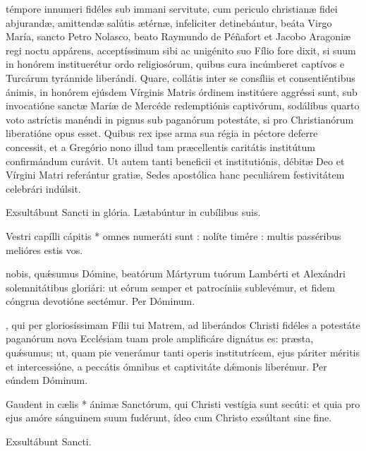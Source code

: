 \documentclass[fontsize=9pt,paper=A6,twoside,BCOR=1mm,DIV=22,headinclude]{scrarticle}
\begin{document}
\begin{multicols}{2}
{
 témpore innumeri fidéles sub immani servitute, cum periculo christianæ fidei abjurandæ, amittendæ salútis ætérnæ, infeliciter detinebántur, beáta Virgo María, sancto Petro Nolasco, beato Raymundo de Péñafort et Jacobo Aragoniæ regi noctu appárens, acceptíssimum sibi ac unigénito suo Fílio fore dixit, si suum in honórem instituerétur ordo religiosórum, quibus cura incúmberet captívos e Turcárum tyránnide liberándi. Quare, collátis inter se consíliis et consentiéntibus ánimis, in honórem ejúsdem Vírginis Matris órdinem institúere aggréssi sunt, sub invocatióne sanctæ Maríæ de Mercéde redemptiónis captivórum, sodálibus quarto voto astríctis manéndi in pignus sub paganórum potestáte, si pro Christianórum liberatióne opus esset. Quibus rex ipse arma sua régia in péctore deferre concessit, et a Gregório nono illud tam præcellentis caritátis institútum confirmándum curávit. Ut autem tanti beneficii et institutiónis, débitæ Deo et Vírgini Matri referántur gratiæ, Sedes apostólica hanc peculiárem festivitátem celebrári indúlsit.

\Te

\V Exsultábunt Sancti in glória.
\R Lætabúntur in cubílibus suis.

\B Vestri capílli cápitis * omnes numeráti sunt : nolíte timére : multis passéribus melióres estis vos.

 nobis, qu\'æsumus Dómine, beatórum Mártyrum tu\-ó\-rum Lambérti et Alexándri solemnitátibus gloriári: ut eórum semper et patrocíniis sublevémur, et fidem cóngrua devotióne sectémur. Per Dóminum.


\AiiBMV

\VRBMVii

, qui per gloriosíssimam Fílii tui Matrem, ad liberándos Christi fidéles a potestáte paganórum nova Ecclésiam tuam prole amplificáre dignátus es: præsta, quǽsumus; ut, quam pie venerámur tanti operis institutrícem, ejus páriter méritis et intercessióne, a peccátis ómnibus et captivitáte dǽmonis liberémur. Per eúndem Dóminum.


\M Gaudent in cælis * ánimæ Sanctórum, qui Christi vestígia sunt secúti: et quia pro ejus amóre sánguinem suum fudérunt, ídeo cum Christo exsúltant sine fine.

\V Exsultábunt Sancti.

}
\end{multicols}
\end{document}
